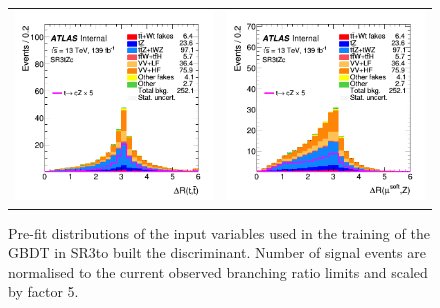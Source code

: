 \begin{figure}[htbp]
\begin{tabular}{cc}
		\includegraphics[width=.45\textwidth]{Chapters/CH5/figures/SR3_UsingSMT/ttbar_dR} &
		\includegraphics[width=.45\textwidth]{Chapters/CH5/figures/SR3_UsingSMT/softmuZ_dR} \\
	\end{tabular}
	\caption{Pre-fit distributions of the input variables used in the training of the GBDT in SR3\tZc to built the \Dthree discriminant. Number of signal events are normalised to the current observed branching ratio limits and scaled by factor 5.  
		\ErrStatOnly
		\Blinded
	}%
	\label{fig:separation:SR3}
\end{figure}

